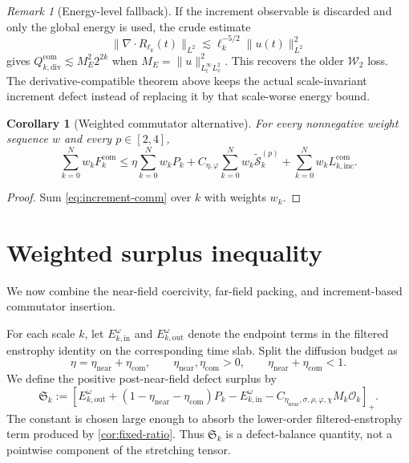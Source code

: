 \documentclass[11pt]{article}
\numberwithin{equation}{section}
\theoremstyle{plain}
\newtheorem{corollary}[theorem]{Corollary}
\theoremstyle{definition}
\theoremstyle{remark}
\newtheorem{remark}[theorem]{Remark}
\begin{document}
\begin{remark}[Energy-level fallback]\label{rem:energy-fallback}
If the increment observable is discarded and only the global energy is used, the crude estimate
\[
\|\nabla\!\cdot R_{\ell_k}(t)\|_{L^2}
\lesssim
\ell_k^{-5/2}\|u(t)\|_{L^2}^2
\]
gives $Q_{k,\mathrm{div}}^{\mathrm{com}}\lesssim M_E^2 2^{2k}$ when $M_E=\|u\|_{L_t^\infty L_x^2}^2$.  This recovers the older $\mathcal W_2$ loss.  The derivative-compatible theorem above keeps the actual scale-invariant increment defect instead of replacing it by that scale-worse energy bound.
\end{remark}

\begin{corollary}[Weighted commutator alternative]\label{cor:weighted-comm-increment}
For every nonnegative weight sequence $w$ and every $p\in[2,4]$,
\begin{equation}\label{eq:weighted-comm-increment}
\sum_{k=0}^N w_k F_k^{\mathrm{com}}
\le
\eta\sum_{k=0}^N w_k P_k
+
C_{\eta,\varphi}\sum_{k=0}^N w_k\widetilde{\mathcal S}_k^{(p)}
+
\sum_{k=0}^N w_k L_{k,\mathrm{inc}}^{\mathrm{com}}.
\end{equation}
\end{corollary}

\begin{proof}
Sum \eqref{eq:increment-comm} over $k$ with weights $w_k$.
\end{proof}

\section{Weighted surplus inequality}\label{sec:weighted-surplus}

We now combine the near-field coercivity, far-field packing, and increment-based commutator insertion.


For each scale $k$, let $E_{k,\mathrm{in}}^\omega$ and $E_{k,\mathrm{out}}^\omega$ denote the endpoint terms in the filtered enstrophy identity on the corresponding time slab.  Split the diffusion budget as
\[
\eta=\eta_{\mathrm{near}}+\eta_{\mathrm{com}},
\qquad
\eta_{\mathrm{near}},\eta_{\mathrm{com}}>0,
\qquad
\eta_{\mathrm{near}}+\eta_{\mathrm{com}}<1.
\]
We define the positive post-near-field defect surplus by
\begin{equation}\label{eq:Sk-def}
\mathfrak S_k
:=
\left[
E_{k,\mathrm{out}}^\omega
+
(1-\eta_{\mathrm{near}}-\eta_{\mathrm{com}})P_k
-
E_{k,\mathrm{in}}^\omega
-
C_{\eta_{\mathrm{near}},\sigma,\rho,\varphi,\chi}M_k\mathcal O_k
\right]_+ .
\end{equation}
The constant is chosen large enough to absorb the lower-order filtered-enstrophy term produced by \cref{cor:fixed-ratio}.  Thus $\mathfrak S_k$ is a defect-balance quantity, not a pointwise component of the stretching tensor.
\end{document}
